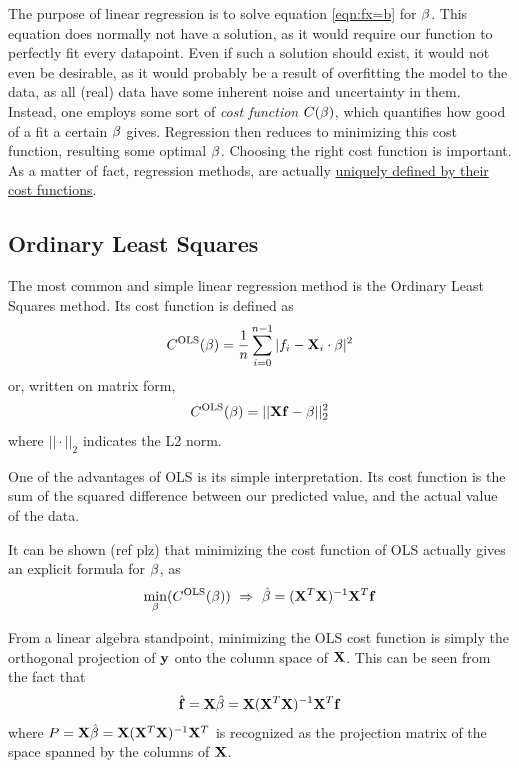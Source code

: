 \documentclass[10pt, twocolumn]{article}
\begin{document}
The purpose of linear regression is to solve equation \cref{eqn:fx=b} for $\vb{\beta}$. This equation does normally not have a solution, as it would require our function to perfectly fit every datapoint. Even if such a solution should exist, it would not even be desirable, as it would probably be a result of overfitting the model to the data, as all (real) data have some inherent noise and uncertainty in them. Instead, one employs some sort of \textit{cost function} $C(\vb{\beta})$, which quantifies how good of a fit a certain $\vb{\beta}$ gives. Regression then reduces to minimizing this cost function, resulting some optimal $\vb{\beta}$. Choosing the right cost function is important. As a matter of fact, regression methods, are actually \underline{uniquely defined by their cost functions}.


\subsection{Ordinary Least Squares}
\label{subsec:OLS}
The most common and simple linear regression method is the Ordinary Least Squares method. Its cost function is defined as
\begin{align}
    C^\text{OLS}(\vb{\beta}) = \frac{1}{n}\sum\limits_{i=0}^{n-1} |f_i - \vb{X}_i \cdot \vb{\beta}|^2
\end{align}
or, written on matrix form,
\begin{align}
    C^\text{OLS}(\vb{\beta}) = ||\vb{X} \vb{f} - \vb{\beta}||^2_2
\end{align}
where $||\cdot||_2$ indicates the L2 norm.

One of the advantages of OLS is its simple interpretation. Its cost function is the sum of the squared difference between our predicted value, and the actual value of the data.

It can be shown (ref plz) that minimizing the cost function of OLS actually gives an explicit formula for $\vb{\beta}$, as
\begin{align}\label{eqn:beta}
    \min_{\vb{\beta}}(C^\text{OLS}(\vb{\beta})) \ \Rightarrow \ \hat{\vb{\beta}} = (\vb{X}^T \vb{X})^{-1}\vb{X}^T\vb{f}
\end{align}

From a linear algebra standpoint, minimizing the OLS cost function is simply the orthogonal projection of $\vb{y}$ onto the column space of $\vb{X}$. This can be seen from the fact that
\begin{align}
    \hat{\vb{f}} = \vb{X} \hat{\vb{\beta}} = \vb{X}(\vb{X}^T \vb{X})^{-1} \vb{X}^T \vb{f}
\end{align}
where $P = \vb{X} \hat{\vb{\beta}} = \vb{X} (\vb{X}^T \vb{X})^{-1} \vb{X}^T$ is recognized as the projection matrix of the space spanned by the columns of $\vb{X}$.
\end{document}
